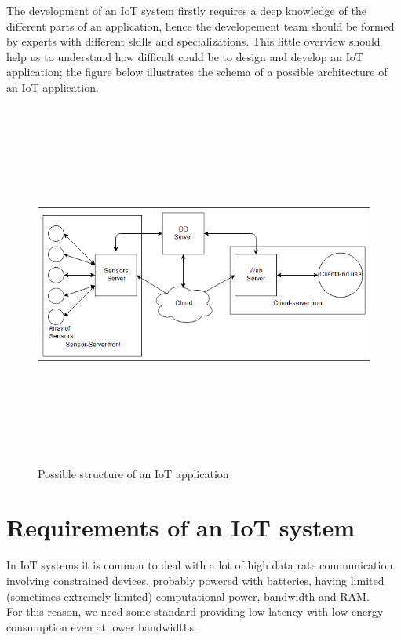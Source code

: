 \documentclass[12pt]{report}
\begin{document}
The development of an IoT system firstly requires a deep knowledge of the different parts of an application, hence the developement team should be formed by experts with different skills and specializations.\newline
This little overview should help us to understand how difficult could be to design and develop an IoT application; the figure below illustrates the schema of a possible architecture of an IoT application.\\

\begin{figure}[H]
\includegraphics[width=13cm,height=12cm,keepaspectratio]{iotapp_architecture}
\caption{Possible structure of an IoT application}
\end{figure}

\bigskip
\section{Requirements of an IoT system}
\bigskip
In IoT systems it is common to deal with a lot of high data rate communication involving constrained devices, probably powered with batteries, having limited (sometimes extremely limited) computational power, bandwidth and RAM.\\
For this reason, we need some standard providing low-latency with low-energy consumption even at lower bandwidths.\\
\end{document}
